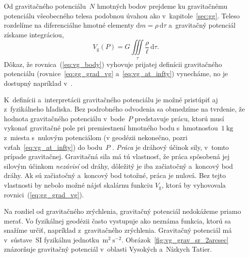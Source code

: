 \documentclass[a4paper, 12pt]{book}
\newcommand{\diff}{\mathrm d}
\newcommand{\gidx}{\mathrm g}
\begin{document}
Od gravitačného potenciálu~$N$ hmotných bodov prejdeme ku
gravitačnému potenciálu všeobecného telesa podobnou úvahou ako
v~kapitole~\ref{sec:gg}.  Teleso rozdelíme na diferenciálne hmotné elementy
$\diff m = \rho \, \diff \tau$ a~gravitačný potenciál získame integráciou,
%
\begin{equation}
\label{eq:vg_body}
V_\gidx(P) = G \iiint\limits_{\tau} \frac{\rho}{\ell} \, \diff\tau{.}
\end{equation}
%
Dôkaz, že rovnica~(\ref{eq:vg_body}) vyhovuje prijatej definícii gravitačného
potenciálu (rovnice~\ref{eq:gg_grad_vg} a~\ref{eq:vg_at_infty}) vynecháme, no 
je
dostupný napríklad v~\textcite{MacMillan1930}.

K~definícii a~interpretácii gravitačného potenciálu je možné pristúpiť aj 
z~fyzikálneho hľadiska.  Bez podrobného odvodenia sa obmedzíme na tvrdenie, že 
hodnota gravitačného potenciálu v~bode~$P$ predstavuje prácu, ktorú musí 
vykonať gravitačné pole pri premiestnení hmotného bodu s~hmotnosťou~$1\ 
\mathrm{kg}$ z~miesta s~nulovým potenciálom (v geodézii nekonečno, pozri 
vzťah~\ref{eq:vg_at_infty}) do bodu~$P$ 
\parencite{MacMillan1930,Kellogg1967,TorgeGeodesy}.  \emph{Práca} je dráhový 
účinok sily, v~tomto prípade gravitačnej.  Gravitačná sila má tú vlastnosť, že 
práca spôsobená jej silovým účinkom \emph{nezávisí} od dráhy, dôležitý je iba 
začiatočný a~koncový bod dráhy.  Ak sú začiatočný a~koncový bod totožné, práca 
je nulová.  Bez tejto vlastnosti by nebolo možné nájsť skalárnu funkciu 
$V_\gidx$, ktorá by vyhovovala rovnici~(\ref{eq:gg_grad_vg}).

Na rozdiel od gravitačného zrýchlenia, gravitačný potenciál nedokážeme
priamo merať.  Vo fyzikálnej geodézii často vystupuje ako neznáma funkcia,
ktorú sa snažíme určiť, napríklad z~gravitačného zrýchlenia.  Gravitačný 
potenciál má v~sústave~SI fyzikálnu jednotku~$\mathrm{m}^2\ \mathrm{s}^{-2}$.  
Obrázok~\ref{fig:vg_grav_sr_2arcsec} znázorňuje gravitačný potenciál v~oblasti 
Vysokých a~Nízkych Tatier.
\end{document}
